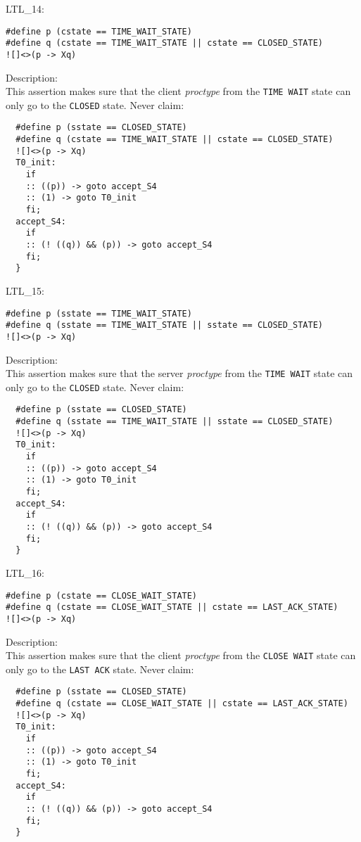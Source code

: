 \documentclass{WigReport}
\begin{document}
LTL\_14:\\
\begin{verbatim}
#define p (cstate == TIME_WAIT_STATE)
#define q (cstate == TIME_WAIT_STATE || cstate == CLOSED_STATE)
![]<>(p -> Xq)
\end{verbatim}
Description:\\
This assertion makes sure that the client \textit{proctype} from the \verb|TIME WAIT| state can only go to the \verb|CLOSED| state.
Never claim:\\
\begin{verbatim}
  #define p (sstate == CLOSED_STATE)
  #define q (cstate == TIME_WAIT_STATE || cstate == CLOSED_STATE)
  ![]<>(p -> Xq)
  T0_init:
    if
    :: ((p)) -> goto accept_S4
    :: (1) -> goto T0_init
    fi;
  accept_S4:
    if
    :: (! ((q)) && (p)) -> goto accept_S4
    fi;
  }
\end{verbatim}


LTL\_15:\\
\begin{verbatim}
#define p (sstate == TIME_WAIT_STATE)
#define q (sstate == TIME_WAIT_STATE || sstate == CLOSED_STATE)
![]<>(p -> Xq)
\end{verbatim}
Description:\\
This assertion makes sure that the server \textit{proctype} from the \verb|TIME WAIT| state can only go to the \verb|CLOSED| state.
Never claim:\\
\begin{verbatim}
  #define p (sstate == CLOSED_STATE)
  #define q (sstate == TIME_WAIT_STATE || sstate == CLOSED_STATE)
  ![]<>(p -> Xq)
  T0_init:
    if
    :: ((p)) -> goto accept_S4
    :: (1) -> goto T0_init
    fi;
  accept_S4:
    if
    :: (! ((q)) && (p)) -> goto accept_S4
    fi;
  }
\end{verbatim}


LTL\_16:\\
\begin{verbatim}
#define p (cstate == CLOSE_WAIT_STATE)
#define q (cstate == CLOSE_WAIT_STATE || cstate == LAST_ACK_STATE)
![]<>(p -> Xq)
\end{verbatim}
Description:\\
This assertion makes sure that the client \textit{proctype} from the \verb|CLOSE WAIT| state can only go to the \verb|LAST ACK| state.
Never claim:\\
\begin{verbatim}
  #define p (sstate == CLOSED_STATE)
  #define q (cstate == CLOSE_WAIT_STATE || cstate == LAST_ACK_STATE)
  ![]<>(p -> Xq)
  T0_init:
    if
    :: ((p)) -> goto accept_S4
    :: (1) -> goto T0_init
    fi;
  accept_S4:
    if
    :: (! ((q)) && (p)) -> goto accept_S4
    fi;
  }
\end{verbatim}
\end{document}
